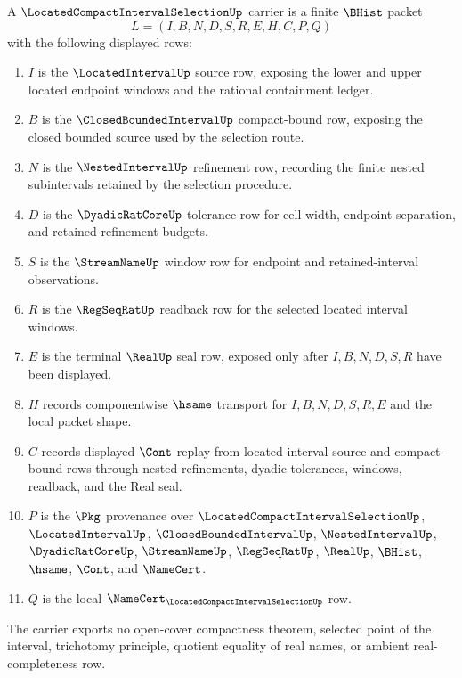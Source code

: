 \begin{definition}
\label{def:located-compact-interval-selection-carrier}
A $\LocatedCompactIntervalSelectionUp$ carrier is a finite $\BHist$ packet
$$
L=(I,B,N,D,S,R,E,H,C,P,Q)
$$
with the following displayed rows:
\begin{enumerate}
\item $I$ is the $\LocatedIntervalUp$ source row, exposing the lower and upper located endpoint windows and the rational containment ledger.
\item $B$ is the $\ClosedBoundedIntervalUp$ compact-bound row, exposing the closed bounded source used by the selection route.
\item $N$ is the $\NestedIntervalUp$ refinement row, recording the finite nested subintervals retained by the selection procedure.
\item $D$ is the $\DyadicRatCoreUp$ tolerance row for cell width, endpoint separation, and retained-refinement budgets.
\item $S$ is the $\StreamNameUp$ window row for endpoint and retained-interval observations.
\item $R$ is the $\RegSeqRatUp$ readback row for the selected located interval windows.
\item $E$ is the terminal $\RealUp$ seal row, exposed only after $I,B,N,D,S,R$ have been displayed.
\item $H$ records componentwise $\hsame$ transport for $I,B,N,D,S,R,E$ and the local packet shape.
\item $C$ records displayed $\Cont$ replay from located interval source and compact-bound rows through nested refinements, dyadic tolerances, windows, readback, and the Real seal.
\item $P$ is the $\Pkg$ provenance over $\LocatedCompactIntervalSelectionUp$, $\LocatedIntervalUp$, $\ClosedBoundedIntervalUp$, $\NestedIntervalUp$, $\DyadicRatCoreUp$, $\StreamNameUp$, $\RegSeqRatUp$, $\RealUp$, $\BHist$, $\hsame$, $\Cont$, and $\NameCert$.
\item $Q$ is the local $\NameCert_{\LocatedCompactIntervalSelectionUp}$ row.
\end{enumerate}
The carrier exports no open-cover compactness theorem, selected point of the interval, trichotomy principle, quotient equality of real names, or ambient real-completeness row.
\end{definition}

